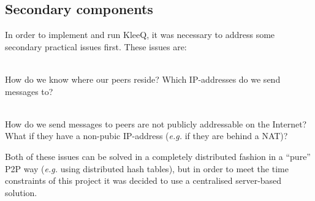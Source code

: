 \documentclass[a4paper, 12pt]{report}
\begin{document}
\subsection{Secondary components}
In order to implement and run KleeQ, it was necessary to address some secondary practical issues first. These issues are:
\begin{description}[labelindent=0.5cm, leftmargin=1.3cm, rightmargin=0.5cm]
    \item[Contact Discovery] \hfill \\
        How do we know where our peers reside? Which IP-addresses do we send messages to?
    \item[Transport] \hfill \\
        How do we send messages to peers are not publicly addressable on the Internet? What if they have a non-pubic IP-address (\textit{e.g.} if they are behind a NAT)?
\end{description}

Both of these issues can be solved in a completely distributed fashion in a ``pure'' P2P way (\textit{e.g.} using distributed hash tables), but in order to meet the time constraints of this project it was decided to use a centralised server-based solution. \\
\end{document}
